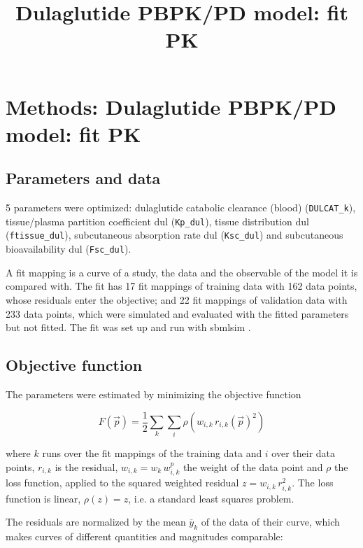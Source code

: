 \documentclass{article}
\title{Dulaglutide PBPK/PD model: fit PK}
\date{}
\begin{document}
\maketitle

\section{Methods: Dulaglutide PBPK/PD model: fit PK}

\subsection{Parameters and data}

5 parameters were optimized: dulaglutide catabolic clearance (blood) (\texttt{DULCAT\_k}), tissue/plasma partition coefficient dul (\texttt{Kp\_dul}), tissue distribution dul (\texttt{ftissue\_dul}), subcutaneous absorption rate dul (\texttt{Ksc\_dul}) and subcutaneous bioavailability dul (\texttt{Fsc\_dul}).

A fit mapping is a curve of a study, the data and the observable of the model it is compared with. The fit has 17 fit mappings of training data with 162 data points, whose residuals enter the objective; and 22 fit mappings of validation data with 233 data points, which were simulated and evaluated with the fitted parameters but not fitted. The fit was set up and run with sbmlsim \cite{Koenig2026_sbmlsim}.

\subsection{Objective function}

The parameters were estimated by minimizing the objective function

\begin{equation}
F(\vec{p}) = \frac{1}{2} \sum_{k} \sum_{i} \rho\left(w_{i,k}\, r_{i,k}(\vec{p})^2\right)
\end{equation}

where $k$ runs over the fit mappings of the training data and $i$ over their data points, $r_{i,k}$ is the residual, $w_{i,k} = w_k\, w^{p}_{i,k}$ the weight of the data point and $\rho$ the loss function, applied to the squared weighted residual $z = w_{i,k}\, r_{i,k}^2$. The loss function is linear, $\rho(z) = z$, i.e. a standard least squares problem.

The residuals are normalized by the mean $\overline{y}_k$ of the data of their curve, which makes curves of different quantities and magnitudes comparable:
\end{document}
